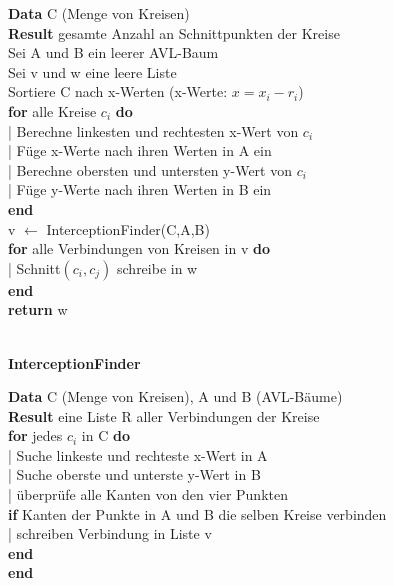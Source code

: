 \documentclass[paper=a4, fontsize=11pt]{scrartcl}
\numberwithin{equation}{section}
\numberwithin{figure}{section}
\numberwithin{table}{section}
\begin{document}
\begin{algorithm}[H]
\SetAlgoLined
\textbf{Data} C (Menge von Kreisen)  \\
\textbf{Result} gesamte Anzahl an Schnittpunkten der Kreise \\
Sei A und B ein leerer AVL-Baum \\
Sei v und w eine leere Liste \\
Sortiere C nach x-Werten (x-Werte: $x=x_{i}-r_{i}$) \\
\textbf{for} alle Kreise $c_{i}$ \textbf{do} \\
 | Berechne linkesten und rechtesten x-Wert von $c_{i}$ \\
 | Füge x-Werte nach ihren Werten in A ein \\
 | Berechne obersten und untersten y-Wert von $c_{i}$ \\
 | Füge y-Werte nach ihren Werten in B ein \\
\textbf{end} \\
v $\leftarrow$ InterceptionFinder(C,A,B) \\
\textbf{for} alle Verbindungen von Kreisen in v \textbf{do} \\
 | Schnitt$(c_{i},c_{j})$ schreibe in w \\
\textbf{end} \\
\textbf{return} w 
\end{algorithm} \\

\textbf{InterceptionFinder} 
\begin{algorithm}[H]
\SetAlgoLined
\textbf{Data} C (Menge von Kreisen), A und B (AVL-Bäume) \\
\textbf{Result} eine Liste R aller Verbindungen der Kreise \\
\textbf{for} jedes $c_{i}$ in C \textbf{do} \\
 | Suche linkeste und rechteste x-Wert in A \\
 | Suche oberste und unterste y-Wert in B \\
 | überprüfe alle Kanten von den vier Punkten \\
\textbf{if} Kanten der Punkte in A und B die selben Kreise verbinden \\
 | schreiben Verbindung in Liste v \\
\textbf{end}\\
\textbf{end}  
\end{algorithm} \\
\end{document}
